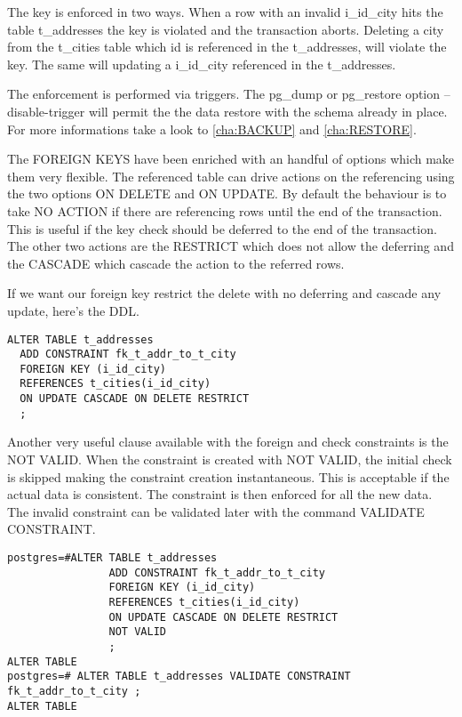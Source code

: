The key is enforced in two ways. When a row with an invalid i\_id\_city hits the table t\_addresses 
the key is violated and the transaction aborts. Deleting a city from the t\_cities table which id 
is referenced in the t\_addresses, will violate the key. The same will updating a i\_id\_city 
referenced in the t\_addresses.\newline

The enforcement is performed via triggers. The pg\_dump or pg\_restore option --disable-trigger 
will permit the the data restore with the schema already in place. For more informations take a 
look to \ref{cha:BACKUP} and  \ref{cha:RESTORE}.\newline

The FOREIGN KEYS have been enriched with an handful of options which make them very flexible. 
The referenced table can drive actions on the referencing using the two options ON DELETE and ON 
UPDATE. By default the behaviour is to take NO ACTION if there are referencing rows until the 
end of the transaction. This is useful if the key check should be deferred to the end of the 
transaction. The other two actions are the RESTRICT which does not allow the deferring and 
the CASCADE which cascade the action to the referred rows. 

If we want our foreign key restrict the delete with no deferring and cascade any update, here's the 
DDL.

\begin{lstlisting}[style=pgsql]
ALTER TABLE t_addresses 
  ADD CONSTRAINT fk_t_addr_to_t_city
  FOREIGN KEY (i_id_city)
  REFERENCES t_cities(i_id_city)
  ON UPDATE CASCADE ON DELETE RESTRICT
  ;

\end{lstlisting}

Another very useful clause available with the foreign and check constraints is the NOT VALID. When 
the constraint is created with NOT VALID, the initial check is skipped making the constraint 
creation instantaneous. This is acceptable if the actual data is consistent. The constraint is then 
enforced for all the new data. The invalid constraint can be validated later with the command 
VALIDATE CONSTRAINT.

\begin{lstlisting}[style=pgsql]
postgres=#ALTER TABLE t_addresses
                ADD CONSTRAINT fk_t_addr_to_t_city
                FOREIGN KEY (i_id_city)
                REFERENCES t_cities(i_id_city)
                ON UPDATE CASCADE ON DELETE RESTRICT
                NOT VALID
                ;
ALTER TABLE
postgres=# ALTER TABLE t_addresses VALIDATE CONSTRAINT fk_t_addr_to_t_city ;
ALTER TABLE

\end{lstlisting}



